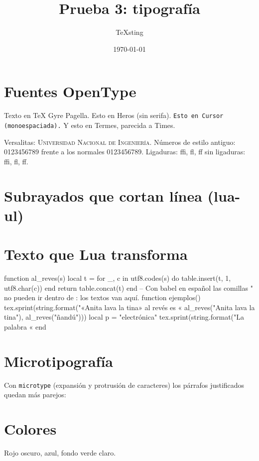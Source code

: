\documentclass[11pt,a4paper]{article}
\title{Prueba 3: tipografía}
\author{TeXsting}
\date{\today}
\begin{document}
\maketitle

\section{Fuentes OpenType}
Texto en TeX Gyre Pagella. \textsf{Esto en Heros (sin serifa).} \texttt{Esto en Cursor (monoespaciada).}
{\termes Y esto en Termes, parecida a Times.}

\medskip
Versalitas: \textsc{Universidad Nacional de Ingeniería}.
Números de estilo antiguo: { 0123456789}
frente a los normales 0123456789.
Ligaduras: ffi, fl, ff \quad sin ligaduras: { ffi, fl, ff}.

\section{Subrayados que cortan línea (lua-ul)}
  

\section{Texto que Lua transforma}
\begin{luacode*}
  function al_reves(s)
    local t = {}
    for _, c in utf8.codes(s) do table.insert(t, 1, utf8.char(c)) end
    return table.concat(t)
  end
  -- Con babel en español las comillas " no pueden ir dentro de \directlua: los textos van aquí.
  function ejemplos()
    tex.sprint(string.format("«Anita lava la tina» al revés es «%
      al_reves("Anita lava la tina"), al_reves("ñandú")))
    local p = "electrónica"
    tex.sprint(string.format("La palabra «%
  end
\end{luacode*}

\section{Microtipografía}
Con \texttt{microtype} (expansión y protrusión de caracteres) los párrafos justificados
quedan más parejos:

\lipsum[1-2]

\section{Colores}
\textcolor{red!70!black}{Rojo oscuro}, \textcolor{blue!60}{azul},
\colorbox{green!15}{fondo verde claro}.
\end{document}

